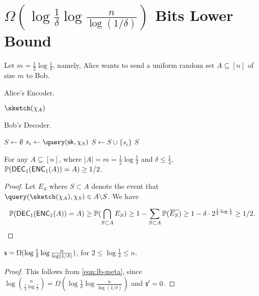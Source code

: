 \section{$\Omega(\log \frac{1}{\delta} \log {\frac{n}{\log(1/\delta)}})$ Bits Lower Bound}\label{sec:simple-lb}
Let $m=\frac{1}{2}\log \frac{1}{\delta}$, namely, Alice wants to send a uniform random set $A\subseteq [n]$ of size $m$ to Bob.

\begin{algorithm}[H]
\caption{Alice's Encoder.}
\begin{algorithmic}[1]
  \State \Return $\sketch(\chi_A)$ 
\EndProcedure
\end{algorithmic}
\end{algorithm}

\begin{algorithm}[H]
\caption{Bob's Decoder.}
\begin{algorithmic}[1]
  \State $S\leftarrow \emptyset$
    \State $s_i\leftarrow \query(\sk, \chi_S)$
    \State $S \leftarrow S \cup \{s_i\}$
  \EndFor
  \State \Return $S$ 
\EndProcedure
\end{algorithmic}
\end{algorithm}

\begin{lemma}
  For any $A\subseteq [n]$, where $|A|=m=\frac{1}{2}\log \frac{1}{\delta}$ and $\delta\le \frac{1}{4}$, $\operatorname*{\mathbb{P}}(\textsf{DEC}_1(\textsf{ENC}_1(A))=A)\ge 1/2$.
\end{lemma}

\begin{proof}
  Let $E_S$ where $S\subset A$ denote the event that $\query(\sketch(\chi_A), \chi_S)\in A\backslash S$. We have 
  
  \begin{align}
  \operatorname*{\mathbb{P}}(\textsf{DEC}_1(\textsf{ENC}_1(A))=A)
  \ge \operatorname*{\mathbb{P}}(\bigcap_{S\subset A}{E_S})
  \ge 1 - \sum_{S\subset A}{\operatorname*{\mathbb{P}}({\overline {E_S}})} 
  \ge 1 - \delta \cdot 2^{\frac{1}{2}\log \frac{1}{\delta}}
  \ge 1/2.
  \end{align}
\end{proof}

\begin{lemma}
  $\textsf{s} = \Omega(\log \frac{1}{\delta} \log \frac{n}{\log (1/\delta)})$, for $2\le \log \frac{1}{\delta} \le n$.
\end{lemma}

\begin{proof}
  This follows from \eqref{eqn:lb-meta}, since $\log {n \choose \frac{1}{2}\log \frac{1}{\delta}}=\Omega(\log \frac{1}{\delta} \log \frac{n}{\log (1/\delta)})$ and $\textsf{s}'=0$. 
\end{proof}
